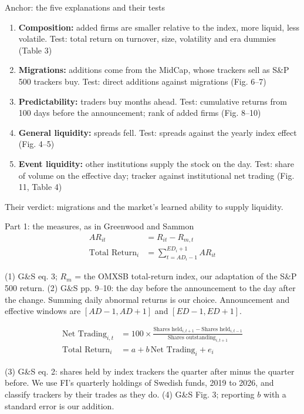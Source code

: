 \documentclass[aspectratio=169]{beamer}
\newcommand{\src}[1]{{\scriptsize\color{gray}#1\par}}
\begin{document}
\begin{frame}{Anchor: the five explanations and their tests}
  \begin{enumerate}
    \item \textbf{Composition:} added firms are smaller relative to the index, more
      liquid, less volatile. Test: total return on turnover, size, volatility and
      era dummies (Table 3)
    \item \textbf{Migrations:} additions come from the MidCap, whose trackers sell as
      S\&P 500 trackers buy. Test: direct additions against migrations (Fig. 6--7)
    \item \textbf{Predictability:} traders buy months ahead. Test: cumulative returns
      from 100 days before the announcement; rank of added firms (Fig. 8--10)
    \item \textbf{General liquidity:} spreads fell. Test: spreads against the yearly
      index effect (Fig. 4--5)
    \item \textbf{Event liquidity:} other institutions supply the stock on the day.
      Test: share of volume on the effective day; tracker against institutional
      net trading (Fig. 11, Table 4)
  \end{enumerate}
  \smallskip
  Their verdict: migrations and the market's learned ability to supply liquidity.
\end{frame}

\begin{frame}{Part 1: the measures, as in Greenwood and Sammon}
  \begin{align}
    AR_{it} &= R_{it} - R_{m,t} \\[2pt]
    \text{Total Return}_i &= \sum_{t=AD_i-1}^{ED_i+1} AR_{it}
  \end{align}
  \src{(1) G\&S eq. 3; $R_m$ = the OMXSB total-return index, our adaptation of the S\&P 500 return.
  (2) G\&S pp. 9--10: the day before the announcement to the day after the change. Summing daily
  abnormal returns is our choice. Announcement and effective windows are $[AD-1, AD+1]$ and $[ED-1, ED+1]$.}
  \begin{align}
    \text{Net Trading}_{i,t} &= 100 \times \frac{\text{Shares held}_{i,t+1} - \text{Shares held}_{i,t-1}}{\text{Shares outstanding}_{i,t+1}} \\[2pt]
    \text{Total Return}_i &= a + b\,\text{Net Trading}_i + e_i
  \end{align}
  \src{(3) G\&S eq. 2: shares held by index trackers the quarter after minus the quarter before. We use
  FI's quarterly holdings of Swedish funds, 2019 to 2026, and classify trackers by their trades as they do.
  (4) G\&S Fig. 3; reporting $b$ with a standard error is our addition.}
\end{frame}
\end{document}
